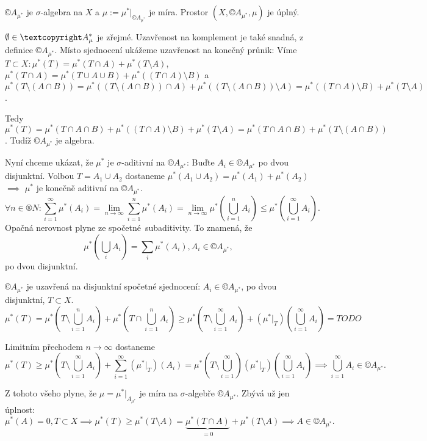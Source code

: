 \documentclass[12pt]{article}					%
\begin{document}
\begin{veta}[Caratheodory]
	$©A_{\mu^*}$ je $\sigma$-algebra na $X$ a $\mu := \mu^*|_{©A_{\mu^*}}$ je míra. Prostor $(X, ©A_{\mu^*}, \mu)$ je úplný.

	\begin{dukazin}
		$\O \in ©A_\mu^*$ je zřejmé. Uzavřenost na komplement je také snadná, z definice $©A_{\mu^*}$. Místo sjednocení ukážeme uzavřenost na konečný průnik: Víme $T \subset X: \mu^*(T) = \mu^*(T\cap A) + \mu^*(T \setminus A)$, $\mu^*(T \cap A) = \mu^*(T \cup A \cup B) + \mu^*((T \cap A) \setminus B)$ a $\mu^*(T\setminus (A \cap B)) = \mu^*((T \setminus (A \cap B)) \cap A) + \mu^*((T \setminus (A \cap B)) \setminus A) = \mu^*((T \cap A) \setminus B) + \mu^*(T \setminus A)$.

		Tedy $\mu^*(T) = \mu^*(T \cap A \cap B) + \mu^*((T \cap A) \setminus B) + \mu^*(T \setminus A) = \mu^*(T \cap A \cap B) + \mu^*(T \setminus (A \cap B))$. Tudíž $©A_{\mu^*}$ je algebra.

		Nyní chceme ukázat, že $\mu^*$ je $\sigma$-aditivní na $©A_{\mu^*}$: Buďte $A_i \in ©A_{\mu^*}$ po dvou disjunktní. Volbou $T = A_1 \cup A_2$ dostaneme $\mu^*(A_1 \cup A_2) = \mu^*(A_1) + \mu^*(A_2)$ $\implies$ $\mu^*$ je konečně aditivní na $©A_{\mu^*}$.
		$$ \forall n \in ®N: \sum_{i=1}^∞ \mu^*(A_i) = \lim_{n \rightarrow ∞} \sum_{i=1}^n \mu^*(A_i) = \lim_{n \rightarrow ∞} \mu^*\left(\bigcup_{i=1}^n A_i\right) ≤ \mu^*\left(\bigcup_{i=1}^∞ A_i\right). $$
		Opačná nerovnost plyne ze spočetné subaditivity. To znamená, že
		$$ \mu^*\left(\bigcup_iA_i\right) = \sum_i\mu^*\left(A_i\right), A_i \in ©A_{\mu^*}, $$
		po dvou disjunktní.

		$©A_{\mu^*}$ je uzavřená na disjunktní spočetné sjednocení: $A_i \in ©A_{\mu^*}$, po dvou disjunktní, $T \subset X$.
		$$ \mu^*(T) = \mu^*\left(T \setminus \bigcup_{i=1}^n A_i\right) + \mu^*\left(T \cap \bigcup_{i=1}^n A_i\right) ≥ \mu^*\left(T\setminus \bigcup_{i=1}^∞ A_i\right) + \left(\mu^*|_T\right)\left(\bigcup_{i=1}^∞ A_i\right) = TODO $$

		Limitním přechodem $n \rightarrow ∞$ dostaneme
		$$ \mu^*(T) ≥ \mu^*(T \setminus \bigcup_{i=1}^∞ A_i) + \sum_{i=1}^∞\left(\mu^*|_T\right)\left(A_i\right) = \mu^*\left(T \setminus \bigcup_{i=1}^∞\right) \left(\mu^*|_T\right)\left(\bigcup_{i=1}^∞ A_i\right) \implies \bigcup_{i=1}^∞ A_i \in ©A_{\mu^*}. $$

		Z tohoto všeho plyne, že $\mu = \mu^*|_{A_{\mu^*}}$ je míra na $\sigma$-algebře $©A_{\mu^*}$. Zbývá už jen úplnost:
		$$ \mu^*(A) = 0, T \subset X \implies \mu^*(T) ≥ \mu^*(T\setminus A) = \underbrace{\mu^*(T \cap A)}_{=0} + \mu^*(T \setminus A) \implies A \in ©A_{\mu^*}. $$
	\end{dukazin}
\end{veta}
\end{document}
